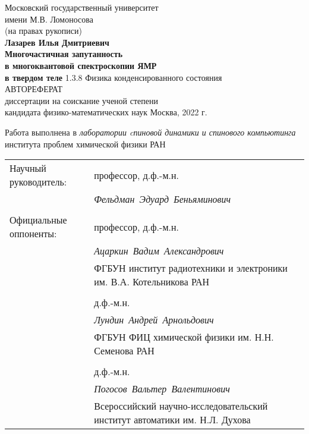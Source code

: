 \begin{titlepage}
\vfill
\begin{center}
  {\large
    Московский государственный университет \\
    имени М.В. Ломоносова
  } \\
  \vfill
  (на правах рукописи) \\
  \vfill
  {\Large \bf Лазарев Илья Дмитриевич} \\
  \vspace{1cm}
  {\Large \bf
      Многочастичная запутанность \\
      в многоквантовой спектроскопии ЯМР \\
      \vspace{2mm}
      в твердом теле
  }
 \vfill
  1.3.8 Физика конденсированного состояния \\
 \vspace{1cm}
 АВТОРЕФЕРАТ \\
 диссертации на соискание ученой степени \\
 кандидата физико-математических наук
 \vfill
 Москва, 2022 г.
\end{center}
\end{titlepage}

Работа выполнена в \textit{лаборатории cпиновой динамики и спинового компьютинга} института проблем химической физики РАН

\vfill

\begin{tabularx}{\textwidth}{
  >{\raggedright\arraybackslash}X
  >{\raggedright\arraybackslash}X
}%
Научный руководитель: & профессор, д.ф.-м.н. \\
 & \mbox{\textit{Фельдман Эдуард Беньяминович}} \\
 & \\
Официальные оппоненты:
& профессор, д.ф.-м.н. \\ 
& \mbox{\textit{Ацаркин Вадим Александрович}} \\ 
& ФГБУН институт радиотехники и электроники им. В.А. Котельникова РАН \\
& \\
& д.ф.-м.н. \\
& \mbox{\textit{Лундин Андрей Арнольдович}} \\
& ФГБУН ФИЦ химической физики им. Н.Н. Семенова РАН \\
& \\
& д.ф.-м.н. \\
& \mbox{\textit{Погосов Вальтер Валентинович}} \\
& Всероссийский научно-исследовательский институт автоматики им. Н.Л. Духова 
\end{tabularx}


